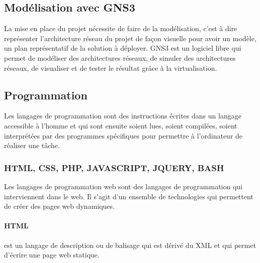 \documentclass[a4paper,12pt,french]{report} %
\begin{document}
\subsection{Modélisation avec GNS3}
La mise en place du projet nécessite de faire de la modélisation, c'est à dire représenter l'architecture réseau du projet de façon visuelle pour avoir un modèle, un plan représentatif de la solution à déployer. GNS3 est un logiciel libre qui permet de modéliser des architectures réseaux, de simuler des architectures réseaux, de visualiser et de tester le résultat grâce à la virtualisation.
\subsection{Programmation}
Les langages de programmation sont des instructions écrites dans un langage accessible à l'homme et qui sont ensuite soient lues, soient compilées, soient interprétées par des programmes spécifiques pour permettre à l'ordinateur de réaliser une tâche.
\subsubsection{HTML, CSS, PHP, JAVASCRIPT, JQUERY, BASH}
Les langages de programmation  web sont des langages de programmation qui interviennent dans le web. Il s'agit d'un ensemble de technologies qui permettent de créer des pages web dynamiques.
\paragraph{HTML} est un langage de description ou de balisage qui est dérivé du XML et qui permet d'écrire une page web statique. 
\end{document}
